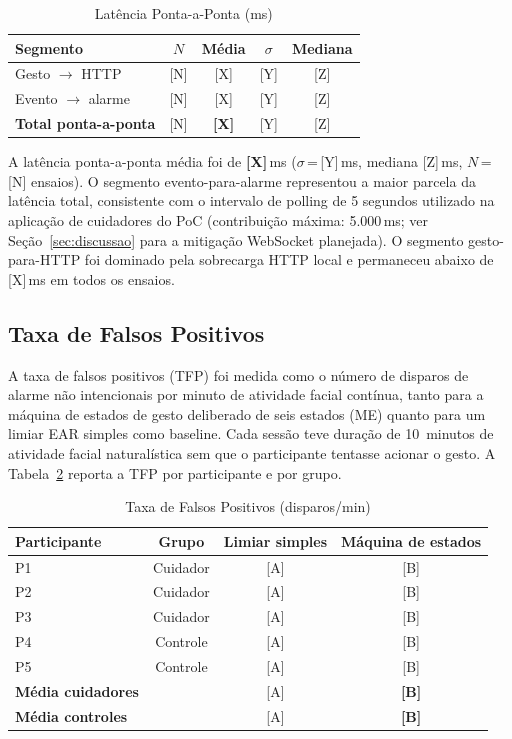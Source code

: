 \begin{table}[htbp]
  \renewcommand{\arraystretch}{1.15}
  \caption{Latência Ponta-a-Ponta (ms)}
  \label{tab:latencia}
  \centering
  \begin{tabular}{lcccc}
    \toprule
    Segmento & $N$ & Média & $\sigma$ & Mediana \\
    \midrule
    Gesto $\rightarrow$ HTTP  & [N] & [X] & [Y] & [Z] \\
    Evento $\rightarrow$ alarme & [N] & [X] & [Y] & [Z] \\
    \textbf{Total ponta-a-ponta} & [N] & \textbf{[X]} & [Y] & [Z] \\
    \bottomrule
  \end{tabular}
\end{table}

A latência ponta-a-ponta média foi de \textbf{[X]}\,ms ($\sigma$\,=\,[Y]\,ms, mediana
[Z]\,ms, $N$\,=\,[N] ensaios). O segmento evento-para-alarme representou a maior
parcela da latência total, consistente com o intervalo de polling de 5 segundos
utilizado na aplicação de cuidadores do PoC (contribuição máxima: 5.000\,ms; ver
Seção~\ref{sec:discussao} para a mitigação WebSocket planejada). O segmento
gesto-para-HTTP foi dominado pela sobrecarga HTTP local e permaneceu abaixo de
[X]\,ms em todos os ensaios.

\subsection{Taxa de Falsos Positivos}
\label{sec:taxafp}

A taxa de falsos positivos (TFP) foi medida como o número de disparos de alarme não
intencionais por minuto de atividade facial contínua, tanto para a máquina de estados
de gesto deliberado de seis estados (ME) quanto para um limiar EAR simples como
baseline. Cada sessão teve duração de 10~minutos de atividade facial naturalística
sem que o participante tentasse acionar o gesto. A Tabela~\ref{tab:fp} reporta a TFP
por participante e por grupo.

\begin{table}[htbp]
  \renewcommand{\arraystretch}{1.15}
  \caption{Taxa de Falsos Positivos (disparos/min)}
  \label{tab:fp}
  \centering
  \begin{tabular}{lccc}
    \toprule
    Participante & Grupo & Limiar simples & Máquina de estados \\
    \midrule
    P1 & Cuidador & [A] & [B] \\
    P2 & Cuidador & [A] & [B] \\
    P3 & Cuidador & [A] & [B] \\
    P4 & Controle & [A] & [B] \\
    P5 & Controle & [A] & [B] \\
    \midrule
    \textbf{Média cuidadores} & & [A] & \textbf{[B]} \\
    \textbf{Média controles}  & & [A] & \textbf{[B]} \\
    \bottomrule
  \end{tabular}
\end{table}

